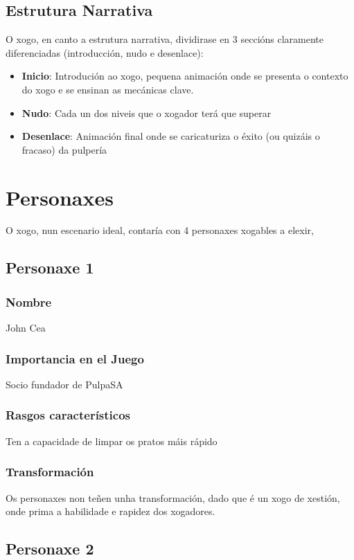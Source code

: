 \documentclass{report}  %
\begin{document}
\subsection{Estrutura Narrativa}

O xogo, en canto a estrutura narrativa, dividirase en 3 seccións claramente diferenciadas (introducción, nudo e desenlace):

\begin{itemize}
    \item \textbf{Inicio}: Introdución ao xogo, pequena animación onde se presenta o contexto do xogo e se ensinan as mecánicas clave.
    \item \textbf{Nudo}: Cada un dos niveis que o xogador terá que superar
    \item \textbf{Desenlace}: Animación final onde se caricaturiza o éxito (ou quizáis o fracaso) da pulpería
\end{itemize}


\newpage
\section{Personaxes}
O xogo, nun escenario ideal, contaría con 4 personaxes xogables a elexir,

\subsection{Personaxe 1}
\subsubsection{Nombre}
John Cea
\subsubsection{Importancia en el Juego}
Socio fundador de PulpaSA \footnotemark[1]
\subsubsection{Rasgos característicos}
Ten a capacidade de limpar os pratos máis rápido \footnotemark[2]
\subsubsection{Transformación}
Os personaxes non teñen unha transformación, dado que é un xogo de xestión, onde prima a habilidade e rapidez dos xogadores.

\subsection{Personaxe 2}
\end{document}
